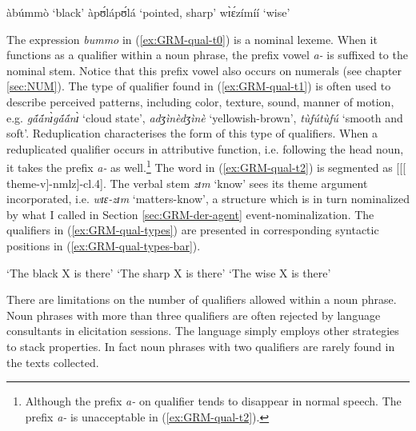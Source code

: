 \begin{exe}
\begin{exe}
\begin{exe}
{\begin{exe}
\begin{exe}
\begin{exe}
\begin{exe}
\begin{exe}
\begin{exe}
\begin{exe}
\begin{xlist}
\begin{exe}
\ea\label{ex:GRM-qual-types}
 
 \ea\label{ex:GRM-qual-t0} àbúmmò `black'  
     \ex\label{ex:GRM-qual-t1} àpʊ́lápʊ́lá `pointed, sharp'
  \ex\label{ex:GRM-qual-t2}  wɪ̀ɛ́zímíí  `wise' 


 
\z 
 \z


The expression {\it bummo} in (\ref{ex:GRM-qual-t0}) is a nominal lexeme. When
it functions as a qualifier within a noun phrase,  the prefix vowel {\it a-} is
suffixed to the nominal stem. Notice that this prefix vowel also occurs on
numerals (see chapter \ref{sec:NUM}). The type of qualifier found in
(\ref{ex:GRM-qual-t1}) is often used to
describe perceived patterns, including color, texture, sound, manner of motion,
e.g. {\it gã́ã́nɪ̀gã́ã́nɪ̀} `cloud state',  {\it adʒìnèdʒìnè}
`yellowish-brown',  {\it tùfútùfú} `smooth and soft'. Reduplication
characterises the form of this type of qualifiers. When a reduplicated qualifier
occurs in attributive function, i.e. following the head noun, it takes the
prefix {\it a-} as well.\footnote{Although the prefix {\it a-} on qualifier 
tends
to disappear in
normal speech. The prefix {\it a-} is unacceptable in (\ref{ex:GRM-qual-t2}).}
The word in (\ref{ex:GRM-qual-t2}) is segmented as [[[{\sc
theme}-v]-{\sc nmlz}]-{\sc cl.4}]. The verbal stem {\it zɪm} `know'   sees  its
theme argument incorporated, i.e.  {\it wɪɛ-zɪm} `matters-know',  a structure
which is in turn nominalized by what I called in Section \ref{sec:GRM-der-agent}
event-nominalization.  The qualifiers in
(\ref{ex:GRM-qual-types}) are presented 
in corresponding syntactic positions in (\ref{ex:GRM-qual-types-bar}). 



\ea\label{ex:GRM-qual-types-bar}
 

   `The black X  is
there'
   `The
sharp  X is there'
 `The wise X is
there'
  
\z 
 \z



There are  limitations
on the number of qualifiers allowed within a noun phrase. Noun phrases with 
more than three qualifiers are often rejected by language consultants in
elicitation sessions.  The
language simply employs other strategies to stack properties. In fact noun
phrases with two qualifiers are rarely found in the texts
collected. 


\end{exe}
\end{xlist}
\end{exe}
\end{exe}
\end{exe}
\end{exe}
\end{exe}
\end{exe}
\end{exe}}
\end{exe}
\end{exe}
\end{exe}
